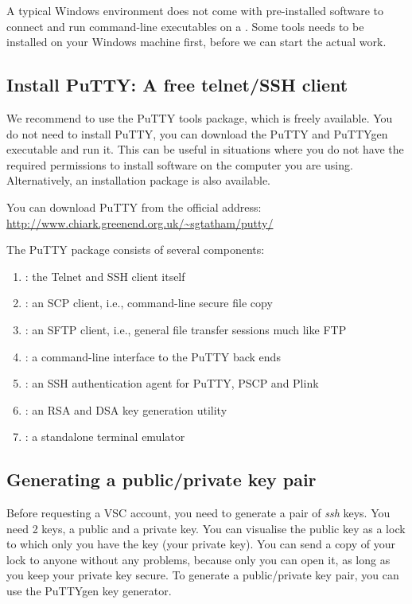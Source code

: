 \ifwindows
  A typical Windows environment does not come with pre-installed
  software to connect and run command-line executables on a \hpc. Some tools
  needs to be installed on your Windows machine first, before we can start the
  actual work.

  \subsection{Install PuTTY: A free telnet/SSH client}
  \label{sec:install-putty}

  We recommend to use the PuTTY tools package, which is freely available. You
  do not need to install PuTTY, you can download the PuTTY and PuTTYgen executable
  and run it. This can be useful in situations where you do not have the
  required permissions to install software on the computer you are using.
  Alternatively, an installation package is also available.

  You can download PuTTY from the official address:
  \url{http://www.chiark.greenend.org.uk/\~sgtatham/putty/}

  The PuTTY package consists of several components:

  \begin{enumerate}
    \item  {}: the Telnet and SSH client itself
    \item  {}: an SCP client, i.e., command-line secure file copy
    \item  {}: an SFTP client, i.e., general file transfer sessions much like FTP
    \item  {}: a command-line interface to the PuTTY back ends
    \item  {}: an SSH authentication agent for PuTTY, PSCP and Plink
    \item  {}: an RSA and DSA key generation utility
    \item  {}: a standalone terminal emulator
  \end{enumerate}

  \subsection{Generating a public/private key pair}
  \label{sec:generate-key-pair}

  Before requesting a VSC account, you need to generate a pair of \emph{ssh}
  keys. You need 2 keys, a public and a private key. You can visualise the public
  key as a lock to which only you have the key (your private key). You can send
  a copy of your lock to anyone without any problems, because only you can
  open it, as long as you keep your private key secure.
  To generate a public/private key pair, you can use the PuTTYgen key generator.


